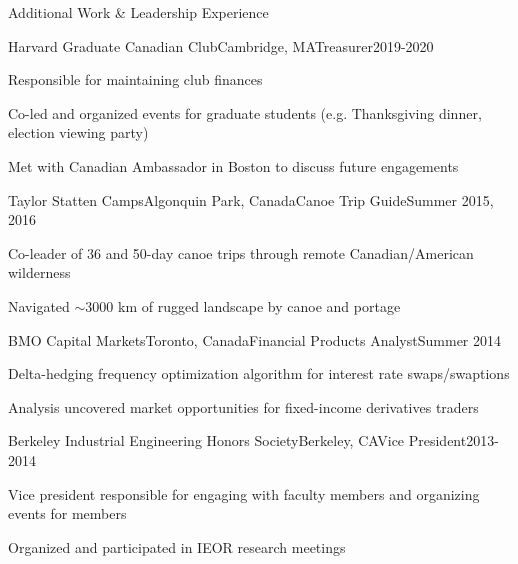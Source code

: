 \documentclass{resume} %
\begin{document}
\begin{rSection}{Additional Work \& Leadership Experience}

\begin{rSubsection}{Harvard Graduate Canadian Club}{Cambridge, MA}{Treasurer}{2019-2020}

\item Responsible for maintaining club finances
\item Co-led and organized events for graduate students (e.g. Thanksgiving dinner, election viewing party)
\item Met with Canadian Ambassador in Boston to discuss future engagements

\end{rSubsection}


\begin{rSubsection}{Taylor Statten Camps}{Algonquin Park, Canada}{Canoe Trip Guide}{Summer 2015, 2016}

\item Co-leader of 36 and 50-day canoe trips through remote Canadian/American wilderness
\item Navigated ${\sim}3000$ km of rugged landscape by canoe and portage

\end{rSubsection}


\begin{rSubsection}{BMO Capital Markets}{Toronto, Canada}{Financial Products Analyst}{Summer 2014}

\item Delta-hedging frequency optimization algorithm for interest rate swaps/swaptions
\item Analysis uncovered market opportunities for fixed-income derivatives traders
    
\end{rSubsection}


\begin{rSubsection}{Berkeley Industrial Engineering Honors Society}{Berkeley, CA}{Vice President}{2013-2014}

\item Vice president responsible for engaging with faculty members and organizing events for members
\item Organized and participated in IEOR research meetings

\end{rSubsection}


\end{rSection}

\end{document}

